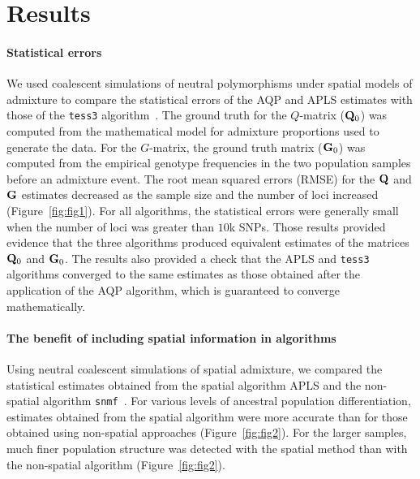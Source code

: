 \clearpage
\newpage


\section{Results}
\paragraph{Statistical errors} We used coalescent simulations of neutral
polymorphisms under spatial models of admixture to compare the statistical
errors of the AQP and APLS estimates with those of the {\tt tess3}
algorithm~\citep{Caye2016}. The ground truth for the $Q$-matrix (${\bf Q}_0$)
was computed from the mathematical model for admixture proportions used to
generate the data. For the $G$-matrix, the ground truth matrix (${\bf G}_0$) was
computed from the empirical genotype frequencies in the two population samples
before an admixture event. The root mean squared errors (RMSE) for the ${\bf Q}$
and ${\bf G}$ estimates decreased as the sample size and the number of loci
increased (Figure~\ref{fig:fig1}). For all algorithms, the statistical errors were generally
small when the number of loci was greater than $10$k SNPs. Those results
provided evidence that the three algorithms produced equivalent estimates of the
matrices ${\bf Q}_0$ and ${\bf G}_0$. The results also provided a check
that the APLS and {\tt tess3} algorithms converged to the same estimates as
those obtained after the application of the AQP algorithm, which is guaranteed
to converge mathematically.


\paragraph{The benefit of including spatial information in algorithms} Using
neutral coalescent simulations of spatial admixture, we compared the statistical
estimates obtained from the spatial algorithm APLS and the non-spatial
algorithm {\tt snmf}~\citep{Frichot2014}. For various levels of ancestral
population differentiation, estimates obtained from the spatial algorithm were
more accurate than for those obtained using non-spatial approaches
(Figure~\ref{fig:fig2}). For the larger samples, much finer population structure
was detected with the spatial method than with the non-spatial algorithm
(Figure~\ref{fig:fig2}).

